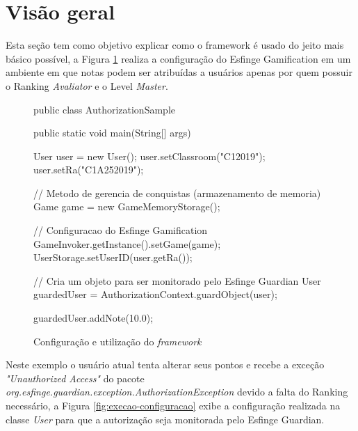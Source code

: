 \section{Visão geral}

\par Esta seção tem como objetivo explicar como o framework é usado do jeito mais básico possível, a Figura \ref{fig:hello-world-gamification} realiza a configuração do Esfinge Gamification em um ambiente em que notas podem ser atribuídas a usuários apenas por quem possuir o Ranking \textit{Avaliator} e o Level \textit{Master}. 


\begin{figure}[H]
    \centering
    \begin{java}
    public class AuthorizationSample {
    
	public static void main(String[] args) {

		User user = new User();
		user.setClassroom("C12019");
		user.setRa("C1A252019");
		
		// Metodo de gerencia de conquistas (armazenamento de memoria)
		Game game = new GameMemoryStorage();

		// Configuracao do Esfinge Gamification
		GameInvoker.getInstance().setGame(game);
		UserStorage.setUserID(user.getRa());

		// Cria um objeto para ser monitorado pelo Esfinge Guardian
		User guardedUser = AuthorizationContext.guardObject(user);

		guardedUser.addNote(10.0);

	}
}
    \end{java}
    \caption{Configuração e utilização do \textit{framework}}
    \label{fig:hello-world-gamification}
\end{figure}

Neste exemplo o usuário atual tenta alterar seus pontos e recebe a exceção \textit{"Unauthorized Access"} do pacote \textit{org.esfinge.guardian.exception.AuthorizationException} devido a falta do Ranking necessário, a Figura \ref{fig:execao-configuracao} exibe a configuração realizada na classe \textit{User} para que a autorização seja monitorada pelo Esfinge Guardian.

